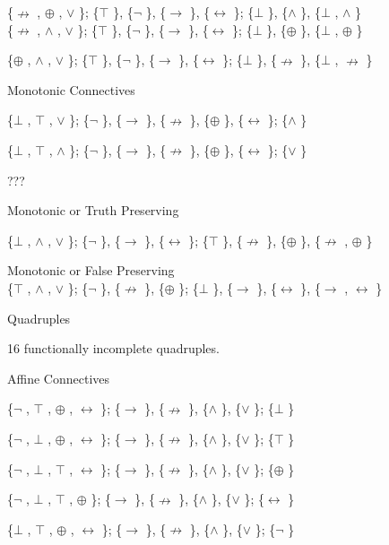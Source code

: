 \{$\nrightarrow$ , $\oplus$ , $\lor$ \}; \{$\top$ \}, \{$\neg$ \}, \{$\to$ \}, \{$\leftrightarrow$ \}; \{$\bot$ \}, \{$\land$ \}, \{$\bot$ , $\land$ \}\\
\{$\nrightarrow$ , $\land$ , $\lor$ \}; \{$\top$ \}, \{$\neg$ \}, \{$\to$ \}, \{$\leftrightarrow$ \}; \{$\bot$ \}, \{$\oplus$ \}, \{$\bot$ , $\oplus$ \}

\{$\oplus$ , $\land$ , $\lor$ \}; \{$\top$ \}, \{$\neg$ \}, \{$\to$ \}, \{$\leftrightarrow$ \}; \{$\bot$ \}, \{$\nrightarrow$ \}, \{$\bot$ , $\nrightarrow$ \}

\protect\hypertarget{anchor-18}{}{}Monotonic Connectives

\{$\bot$ , $\top$ , $\lor$ \}; \{$\neg$ \}, \{$\to$ \}, \{$\nrightarrow$ \}, \{$\oplus$ \}, \{$\leftrightarrow$ \}; \{$\land$ \}

\{$\bot$ , $\top$ , $\land$ \}; \{$\neg$ \}, \{$\to$ \}, \{$\nrightarrow$ \}, \{$\oplus$ \}, \{$\leftrightarrow$ \}; \{$\lor$ \}

\protect\hypertarget{anchor-19}{}{}???

Monotonic or Truth Preserving

\{$\bot$ , $\land$ , $\lor$ \}; \{$\neg$ \}, \{$\to$ \}, \{$\leftrightarrow$ \}; \{$\top$ \}, \{$\nrightarrow$ \}, \{$\oplus$ \}, \{$\nrightarrow$ , $\oplus$ \}

Monotonic or False Preserving\\
\{$\top$ , $\land$ , $\lor$ \}; \{$\neg$ \}, \{$\nrightarrow$ \}, \{$\oplus$ \}; \{$\bot$ \}, \{$\to$ \}, \{$\leftrightarrow$ \}, \{$\to$ , $\leftrightarrow$ \}

\protect\hypertarget{anchor-20}{}{}Quadruples

16 functionally incomplete quadruples.

\protect\hypertarget{anchor-21}{}{}Affine Connectives

\{$\neg$ , $\top$ , $\oplus$ , $\leftrightarrow$ \}; \{$\to$ \}, \{$\nrightarrow$ \}, \{$\land$ \}, \{$\lor$ \}; \{$\bot$ \}

\{$\neg$ , $\bot$ , $\oplus$ , $\leftrightarrow$ \}; \{$\to$ \}, \{$\nrightarrow$ \}, \{$\land$ \}, \{$\lor$ \}; \{$\top$ \}

\{$\neg$ , $\bot$ , $\top$ , $\leftrightarrow$ \}; \{$\to$ \}, \{$\nrightarrow$ \}, \{$\land$ \}, \{$\lor$ \}; \{$\oplus$ \}

\{$\neg$ , $\bot$ , $\top$ , $\oplus$ \}; \{$\to$ \}, \{$\nrightarrow$ \}, \{$\land$ \}, \{$\lor$ \}; \{$\leftrightarrow$ \}

\{$\bot$ , $\top$ , $\oplus$ , $\leftrightarrow$ \}; \{$\to$ \}, \{$\nrightarrow$ \}, \{$\land$ \}, \{$\lor$ \}; \{$\neg$ \}

